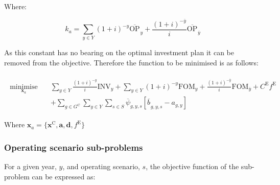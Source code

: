 \documentclass{article}
\newcommand{\sGeneratorsCandidate}{G^{\mathrm{C}}}
\newcommand{\sYears}{Y}
\newcommand{\sScenarios}{S}
\newcommand{\iGenerator}{g}
\newcommand{\iYear}{y}
\newcommand{\iYearTerminal}{\overline{\iYear}}
\newcommand{\iScenario}{s}
\newcommand{\cOperatingCost}[1][\iYear,\iScenario]{\mathrm{OP}_{#1}}
\newcommand{\cFixedOperationsMaintenanceCost}[1][\iGenerator]{\mathrm{FOM}_{#1}}
\newcommand{\cInvestmentCost}[1][\iYear]{\mathrm{INV}_{#1}}
\newcommand{\cInterestRate}{i}
\newcommand{\cEmissionsTargetViolationPenalty}{C^{\mathrm{E}}}
\newcommand{\vEmissionsTargetViolation}{f^{\mathrm{E}}}
\newcommand{\vInstalledCapacityTotal}[1][\iGenerator,\iYear]{a_{#1}}
\newcommand{\vInstalledCapacityTotalScenario}[1][\iGenerator,\iYear,\iScenario]{b_{#1}}
\DeclareMathOperator*{\minimise}{minimise}
\begin{document}
Where:

\begin{equation}
	k_{a} = \sum\limits_{\iYear \in \sYears} (1+\cInterestRate)^{-\iYear} \overline{\cOperatingCost[]}_{\iYear} + \frac{(1+\cInterestRate)^{-\iYearTerminal}}{\cInterestRate} \overline{\cOperatingCost[]}_{\iYearTerminal}
\end{equation}

As this constant has no bearing on the optimal investment plan it can be removed from the objective. Therefore the function to be minimised is as follows:

\begin{align}
	\begin{split}
		\minimise\limits_{\bm{x}_{a}} \quad & \sum\limits_{\iYear \in \sYears} \frac{(1+\cInterestRate)^{-\iYear}}{\cInterestRate}\cInvestmentCost + \sum\limits_{\iYear \in \sYears} (1+\cInterestRate)^{-\iYear} \cFixedOperationsMaintenanceCost[\iYear]  + \frac{(1+\cInterestRate)^{-\iYearTerminal}}{\cInterestRate} \cFixedOperationsMaintenanceCost[\iYearTerminal] + \cEmissionsTargetViolationPenalty \vEmissionsTargetViolation\\
		& + \sum\limits_{\iGenerator \in \sGeneratorsCandidate}\sum\limits_{\iYear \in \sYears}\sum\limits_{\iScenario \in \sScenarios} \overline{\psi}_{\iGenerator,\iYear,\iScenario}\left[\overline{\vInstalledCapacityTotalScenario[]}_{\iGenerator,\iYear,\iScenario} - \vInstalledCapacityTotal\right]
	\end{split}
\end{align}

Where $\bm{x}_{a} = \{\bm{x}^{\mathrm{C}}, \bm{a}, \bm{d}, \vEmissionsTargetViolation\}$

\subsubsection{Operating scenario sub-problems}
For a given year, $\iYear$, and operating scenario, $\iScenario$, the objective function of the sub-problem can be expressed as:
\end{document}
